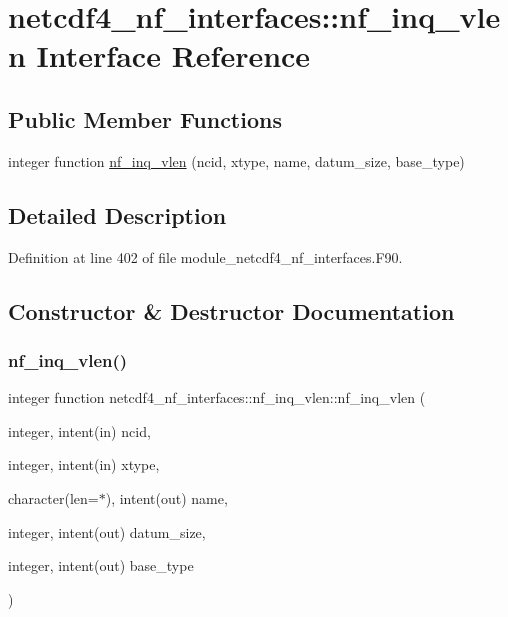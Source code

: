 \hypertarget{interfacenetcdf4__nf__interfaces_1_1nf__inq__vlen}{}\section{netcdf4\+\_\+nf\+\_\+interfaces\+:\+:nf\+\_\+inq\+\_\+vlen Interface Reference}
\label{interfacenetcdf4__nf__interfaces_1_1nf__inq__vlen}
\subsection*{Public Member Functions}
\begin{DoxyCompactItemize}
\item 
integer function \hyperlink{interfacenetcdf4__nf__interfaces_1_1nf__inq__vlen_a88534ed9447295ad920b32eb4f244efc}{nf\+\_\+inq\+\_\+vlen} (ncid, xtype, name, datum\+\_\+size, base\+\_\+type)
\end{DoxyCompactItemize}


\subsection{Detailed Description}


Definition at line 402 of file module\+\_\+netcdf4\+\_\+nf\+\_\+interfaces.\+F90.



\subsection{Constructor \& Destructor Documentation}
\mbox{\label{interfacenetcdf4__nf__interfaces_1_1nf__inq__vlen_a88534ed9447295ad920b32eb4f244efc}} 
\subsubsection{\texorpdfstring{nf\+\_\+inq\+\_\+vlen()}{nf\_inq\_vlen()}}
{\footnotesize\ttfamily integer function netcdf4\+\_\+nf\+\_\+interfaces\+::nf\+\_\+inq\+\_\+vlen\+::nf\+\_\+inq\+\_\+vlen (\begin{DoxyParamCaption}\item[{integer, intent(in)}]{ncid,  }\item[{integer, intent(in)}]{xtype,  }\item[{character(len=$\ast$), intent(out)}]{name,  }\item[{integer, intent(out)}]{datum\+\_\+size,  }\item[{integer, intent(out)}]{base\+\_\+type }\end{DoxyParamCaption})}




